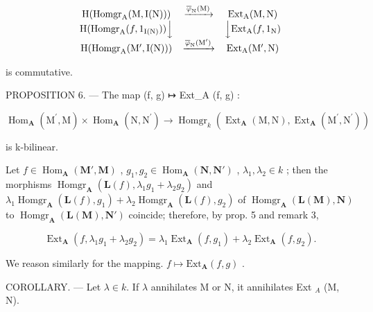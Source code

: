 \[
\begin{array}{c c c} \mathrm{H} (\mathrm{Homgr} _ {\mathrm{A}} (\mathrm{M}, \mathrm{I} (\mathrm{N}))) & \xrightarrow {\overline {{\varphi}} _ {\mathrm{N}} (\mathrm{M})} & \mathrm{Ext} _ {\mathrm{A}} (\mathrm{M}, \mathrm{N}) \\ \mathrm{H} (\mathrm{Homgr} _ {\mathrm{A}} (f, 1 _ {\mathrm{I} (\mathrm{N})})) \Big \downarrow & & \Big \downarrow \mathrm{Ext} _ {\mathrm{A}} (f, 1 _ {\mathrm{N}}) \\ \mathrm{H} (\mathrm{Homgr} _ {\mathrm{A}} (\mathrm{M} ^ {\prime}, \mathrm{I} (\mathrm{N}))) & \xrightarrow {\overline {{\varphi}} _ {\mathrm{N}} (\mathrm{M} ^ {\prime})} & \mathrm{Ext} _ {\mathrm{A}} (\mathrm{M} ^ {\prime}, \mathrm{N}) \end{array}
\]

is commutative.

PROPOSITION 6. --- The map (f, g) ↦ Ext\_A (f, g) :

\[
\operatorname{Hom} _ {\mathbf {A}} \left(\mathrm{M} ^ {\prime}, \mathrm{M}\right) \times \operatorname{Hom} _ {\mathbf {A}} \left(\mathrm{N}, \mathrm{N} ^ {\prime}\right)\rightarrow \operatorname{Homgr} _ {k} \left(\operatorname{Ext} _ {\mathbf {A}} (\mathrm{M}, \mathrm{N}), \operatorname{Ext} _ {\mathbf {A}} \left(\mathrm{M} ^ {\prime}, \mathrm{N} ^ {\prime}\right)\right)
\]

is k-bilinear.

Let \(f \in \operatorname{Hom}_{\mathbf{A}}(\mathbf{M}', \mathbf{M})\) , \(g_1, g_2 \in \operatorname{Hom}_{\mathbf{A}}(\mathbf{N}, \mathbf{N}')\) , \(\lambda_1, \lambda_2 \in k\) ; then the morphisms \(\operatorname{Homgr}_{\mathbf{A}}(\mathbf{L}(f), \lambda_1 g_1 + \lambda_2 g_2)\) and \(\lambda_1 \operatorname{Homgr}_{\mathbf{A}}(\mathbf{L}(f), g_1) + \lambda_2 \operatorname{Homgr}_{\mathbf{A}}(\mathbf{L}(f), g_2)\) of \(\operatorname{Homgr}_{\mathbf{A}}(\mathbf{L}(\mathbf{M}), \mathbf{N})\) to \(\operatorname{Homgr}_{\mathbf{A}}(\mathbf{L}(\mathbf{M}), \mathbf{N}')\) coincide; therefore, by prop. 5 and remark 3,

\[
\operatorname{Ext} _ {\mathbf {A}} \left(f, \lambda_ {1} g _ {1} + \lambda_ {2} g _ {2}\right) = \lambda_ {1} \operatorname{Ext} _ {\mathbf {A}} \left(f, g _ {1}\right) + \lambda_ {2} \operatorname{Ext} _ {\mathbf {A}} \left(f, g _ {2}\right).\tag{10}
\]

We reason similarly for the mapping. \(f\mapsto\mathrm{Ext}_{\mathbf{A}}(f,g)\) .

COROLLARY. --- Let \(\lambda \in k\). If \(\lambda\) annihilates M or N, it annihilates Ext \(_{A}\) (M, N).


